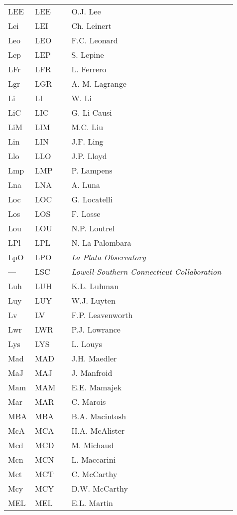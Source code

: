 \begin{longtable}{l|l|c|p{59mm}|l}
LEE & LEE &   & O.J. Lee & \\
Lei & LEI &   & Ch. Leinert & \\
Leo & LEO &   & F.C. Leonard & \\
Lep & LEP &   & S. Lepine & \\
LFr & LFR &   & L. Ferrero & \\
Lgr & LGR &   & A.-M. Lagrange & \\
Li  & LI  &   & W. Li & \\
LiC & LIC &   & G. Li Causi & \\
LiM & LIM &   & M.C. Liu & \\
Lin & LIN &   & J.F. Ling & \\
Llo & LLO &   & J.P. Lloyd & \\
Lmp & LMP &   & P. Lampens & \\
Lna & LNA &   & A. Luna & \\
Loc & LOC &   & G. Locatelli & \\
Los & LOS &   & F. Losse & \\
Lou & LOU &   & N.P. Loutrel & \\
LPl & LPL &   & N. La Palombara & \\
LpO & LPO &   & \emph{La Plata Observatory} & \\
--- & LSC &   & \emph{Lowell-Southern Connecticut Collaboration} & \\
Luh & LUH &   & K.L. Luhman & \\
Luy & LUY &   & W.J. Luyten & \\
Lv  & LV  &   & F.P. Leavenworth & \\
Lwr & LWR &   & P.J. Lowrance & \\
Lys & LYS &   & L. Louys & \\\midrule
Mad & MAD &   & J.H. Maedler & \\
MaJ & MAJ &   & J. Manfroid & \\
Mam & MAM &   & E.E. Mamajek & \\
Mar & MAR &   & C. Marois & \\
MBA & MBA &   & B.A. Macintosh & \\
McA & MCA &   & H.A. McAlister & \\
Mcd & MCD &   & M. Michaud & \\
Mcn & MCN &   & L. Maccarini & \\
Mct & MCT &   & C. McCarthy & \\
Mcy & MCY &   & D.W. McCarthy & \\
MEL & MEL &   & E.L. Martin & \\

\end{longtable}
